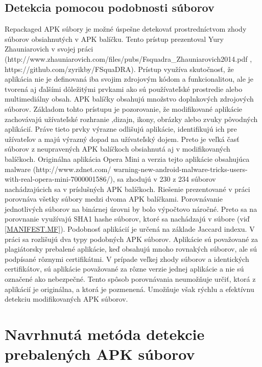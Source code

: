 \subsection{Detekcia pomocou podobnosti súborov}

Repackaged APK súbory je možné úspešne detekovať prostredníctvom zhody súborov obsiahnutých v APK balíčku. Tento prístup prezentoval Yury Zhauniarovich v svojej práci  (http://www.zhauniarovich.com/files/pubs/Fsquadra\_Zhauniarovich2014.pdf , https://github.com/zyrikby/FSquaDRA). Prístup využíva skutočnosť, že aplikácia nie je definovaná iba svojim zdrojovým kódom a funkcionalitou, ale je tvorená aj ďalšími dôležitými prvkami ako sú používateľské prostredie alebo multimediálny obsah. APK balíčky obsahujú množstvo doplnkových zdrojových súborov.  Základom tohto prístupu je pozorovanie, že modifikované aplikácie zachovávajú užívateľské rozhranie ,dizajn, ikony, obrázky alebo zvuky pôvodných aplikácií. Práve tieto prvky výrazne odlišujú aplikácie, identifikujú ich pre užívateľov a majú výrazný dopad na užívateľský dojem. Preto je veľká časť súborov z neupravených APK balíčkoch obsiahnutá aj v modifikovaných balíčkoch. Originálna aplikácia Opera Mini a verzia tejto aplikácie obsahujúca malware (http://www.zdnet.com/
warning-new-android-malware-tricks-users-with-real-opera-mini-7000001586/), sa zhodujú v 230 z 234 súborov nachádzajúcich sa v príslušných APK balíčkoch. Riešenie prezentované v práci  porovnáva všetky súbory medzi dvoma APK balíčkami.  Porovnávanie jednotlivých súborov na binárnej úrovni by bolo výpočtovo náročné. Preto sa na porovnanie využívajú SHA1 hashe súborov, ktoré sa nachádzajú v súbore  (viď \ref{MANIFEST.MF}). Podobnosť aplikácií je určená na základe Jaccard indexu. V práci sa rozlišujú dva typy podobných APK súborov. Aplikácie sú považované za plagiátorsky prebalené aplikácie, keď obsahujú mnoho rovnakých súborov, ale sú podpísané rôznymi certifikátmi. V prípade veľkej zhody súborov a  identických certifikátov, sú aplikácie považované za rôzne verzie jednej aplikácie a nie sú označené ako nebezpečné. Tento spôsob porovnávania neumožňuje určiť, ktorá z aplikácií je originálna, a ktorá je pozmenená.  Umožňuje však rýchlu a efektívnu detekciu modifikovaných APK súborov. 

\section{Navrhnutá metóda detekcie prebalených APK súborov}


